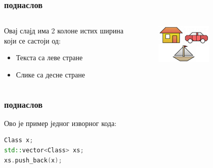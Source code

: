 \documentclass[aspectratio=169]{beamer}
\begin{document}
\begin{frame}
    \frametitle{поднаслов}

    \begin{columns}
        \begin{column}{0.5\textwidth}
            Овај слајд има 2 колоне истих ширина \\
            који се састоји од:

            \begin{itemize}
                \item Текста са леве стране
                
                \item Слике са десне стране
            \end{itemize}
        \end{column}
        \begin{column}{0.5\textwidth}
            \begin{center}
                \includegraphics[width=0.5\textwidth]{resursi/slika.png}
            \end{center}
        \end{column}
    \end{columns}
\end{frame}

\begin{frame}[fragile]
    \frametitle{поднаслов}

    Ово је пример једног изворног кода:

\begin{lstlisting}[language=C++]
Class x;
std::vector<Class> xs;
xs.push_back(x);
\end{lstlisting}
\end{frame}
\end{document}

